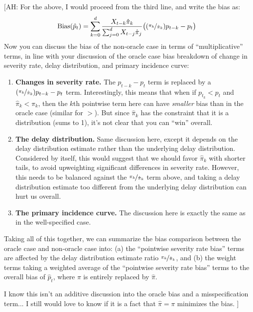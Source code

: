 \documentclass{article}
\newcommand{\ahcomment}[1]{{\color{teal}[AH: #1]}}
\begin{document}
\ahcomment{
  For the above, I would proceed from the third line, and write the bias as:
  \begin{equation*}
    \text{Bias}(\hat{p}_t)
    = \sum_{k=0}^d \frac{
      X_{t-k} \hat{\pi}_k
    }{
      \sum_{j=0}^d X_{t-j}\hat\pi_j
    }\big((\nicefrac{\pi_k}{\hat{\pi}_k}) p_{t-k}- p_t\big)
  \end{equation*}
  Now you can discuss the bias of the non-oracle case in terms of
  ``multiplicative'' terms, in line with your discussion of the oracle case
  bias breakdown of change in severity rate, delay distribution, and
  primary incidence curve:
  \begin{enumerate}
    \item \textbf{Changes in severity rate.}  The $p_{t-k}- p_t$
      term is replaced by
      a $(\nicefrac{\pi_k}{\hat{\pi}_k}) p_{t-k}- p_t$ term.  Interestingly,
      this means that when if $p_{t_k} < p_t$ and $\hat{\pi}_k < \pi_k$,
      then the $k$th pointwise term here can have \emph{smaller} bias than
      in the oracle case (similar for $>$).  But since $\hat{\pi}_k$ has the
      constraint that it is a distribution (sums to 1), it's not clear that
      you can ``win'' overall.
    \item \textbf{The delay distribution.}  Same discussion here, except
      it depends on the delay distribution estimate rather than the
      underlying delay distribution.  Considered by itself, this would
      suggest that we should favor $\hat{\pi}_k$ with shorter tails,
      to avoid upweighting significant differences in severity rate.
      However, this needs to be balanced against the 
      $\nicefrac{\pi_k}{\hat{\pi}_k}$ term above, and taking a delay
      distribution estimate too different from the underlying delay
      distribution can hurt us overall.
    \item \textbf{The primary incidence curve.} The discussion here is
      exactly the same as in the well-specified case.
  \end{enumerate}
  Taking all of this together, we can summarize the bias comparison between
  the oracle case and non-oracle case into: (a) the ``pointwise severity
  rate bias'' terms are affected by the delay distribution estimate ratio
  $\nicefrac{\pi_k}{\hat{\pi}_k}$, and (b) the weight terms taking a weighted
  average of the ``pointwise severity rate bias'' terms to the overall bias
  of $\hat{p}_t$, where $\pi$ is entirely replaced by $\hat{\pi}$.

  I know this isn't an additive discussion into the oracle bias and
  a misspecification term... I still would love to know if it is a fact that
  $\hat{\pi}=\pi$ minimizes the bias.
}
\end{document}
